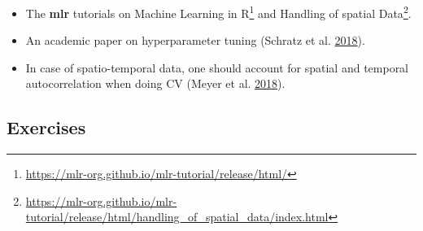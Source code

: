 \documentclass[]{krantz}
\providecommand{\tightlist}{%
  \setlength{\itemsep}{0pt}\setlength{\parskip}{0pt}}
\let\rmarkdownfootnote\footnote%
\def\footnote{\protect\rmarkdownfootnote}
\renewcommand{\href}[2]{#2\footnote{\url{#1}}}
\begin{document}
\begin{itemize}
\tightlist
\item
  The \textbf{mlr} tutorials on \href{https://mlr-org.github.io/mlr-tutorial/release/html/}{Machine Learning in R} and \href{https://mlr-org.github.io/mlr-tutorial/release/html/handling_of_spatial_data/index.html}{Handling of spatial Data}.
\item
  An academic paper on hyperparameter tuning (Schratz et al. \protect\hyperlink{ref-schratz_performance_nodate}{2018}).
\item
  In case of spatio-temporal data, one should account for spatial and temporal autocorrelation when doing CV (Meyer et al. \protect\hyperlink{ref-meyer_improving_2018}{2018}).
\end{itemize}

\hypertarget{exercises-8}{%
\subsection{Exercises}\label{exercises-8}}
\end{document}

